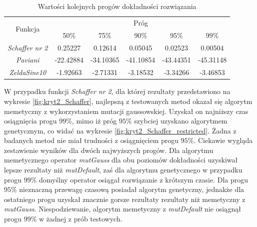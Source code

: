 \begin{table}[ht]
\caption{Wartości kolejnych progów dokładności rozwiązania}
\label{table:kryt2_wartosci_progow}
\begin{center}
\begin{tabular}{|c|c|c|c|c|c|}
	\hline
	\multirow{2}{*}{Funkcja}& \multicolumn{5}{c|}{Próg} \\
	\cline{2-6}
	{} & 50\% & 75\% & 90\% & 95\% & 99\% \\
	\hline
	\emph{Schaffer nr 2} & 0.25227 & 0.12614 & 0.05045 & 0.02523 & 0.00504\\
	\emph{Paviani} & -22.42884 & -34.10365 & -41.10854 & -43.44351 & -45.31148\\
	\emph{ZeldaSine10} & -1.92663 & -2.71331 & -3.18532 & -3.34266 & -3.46853\\
	\hline
	\end{tabular}
\end{center}
\end{table}

\par
W przypadku funkcji \emph{Schaffer nr 2}, dla której rezultaty przedstawiono na wykresie \ref{fig:kryt2_Schaffer}, najlepszą z testowanych metod okazał się algorytm memetyczny z wykorzystaniem mutacji gaussowskiej. Uzyskał on najniższy czas osiągnięcia progu $99\%$, mimo iż próg $95\%$ szybciej uzyskano algorytmem genetycznym, co widać na wykresie \ref{fig:kryt2_Schaffer_restricted}. Żadna z badanych metod nie miał trudności z osiągnięciem progu $95\%$. Ciekawie wygląda zestawienie wyników dla dwóch najwyższych progów. Dla algorytmu memetycznego operator \emph{mutGauss} dla obu poziomów dokładności uzyskiwał lepsze rezultaty niż \emph{mutDefault}, zaś dla algorytmu genetycznego w przypadku progu $99\%$ domyślny operator osiągał rozwiązanie z krótszym czasie. Dla progu $95\%$ nieznaczną przewagę czasową posiadał algorytm genetyczny, jednakże dla ostatniego progu uzyskał znacznie gorsze rezultaty  rezultaty niż memetyczny z \emph{mutGauss}. Niespodziewanie, algorytm memetyczny z \emph{mutDefault} nie osiągnął progu $99\%$ w żadnej z prób testowych. 


